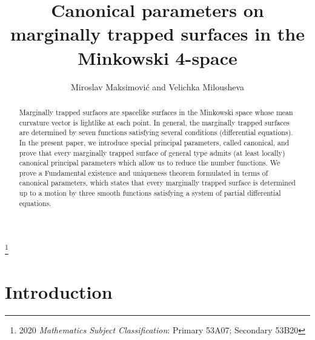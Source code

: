 \documentclass[12pt]{amsart}
\theoremstyle{definition}
\theoremstyle{remark}
\numberwithin{equation}{section}
\begin{document}
\title[Canonical parameters on marginally trapped surfaces]
{Canonical parameters on marginally trapped surfaces in the Minkowski 4-space}%

\thanks{2020 {\it Mathematics Subject Classification}: Primary  53A07; Secondary 53B20}
\author{Miroslav Maksimovi\'c and Velichka Milousheva}%
\address{University of Pri\v{s}tina in Kosovska Mitrovica, Faculty of Sciences and Mathematics, Kosovska Mitrovica, Serbia; and 
Institute of Mathematics and Informatics, Bulgarian Academy of Sciences, Acad. G. Bonchev Str. bl. 8, 1113, Sofia, Bulgaria}
\address{Institute of Mathematics and Informatics, Bulgarian Academy of Sciences, Acad. G. Bonchev Str. bl. 8, 1113, Sofia, Bulgaria}


%

\begin{abstract}

Marginally trapped surfaces are spacelike surfaces in the Minkowski space whose mean curvature vector is lightlike at each point. In general, the 
marginally trapped surfaces are determined by seven functions satisfying  several conditions (differential equations). In the present paper, we introduce special principal parameters, called canonical, and prove that every marginally trapped surface of general type  admits (at least locally) canonical principal parameters which allow us to reduce the number functions. We prove a Fundamental existence and uniqueness theorem formulated in terms of canonical parameters, which states that every marginally trapped surface  is determined up to a motion by three smooth functions satisfying a system of partial differential equations.

\end{abstract}

\maketitle






\section{Introduction}
\end{document}
